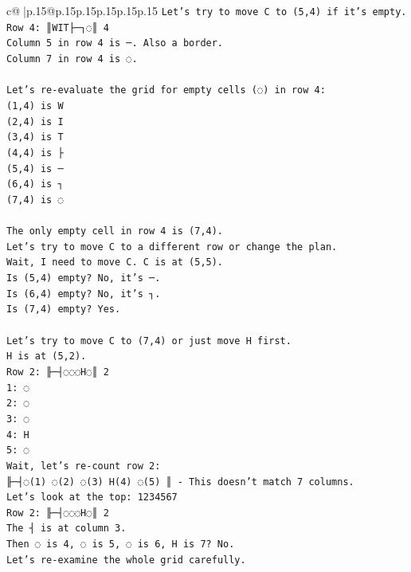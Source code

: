 \documentclass{article}
\begin{document}
{\begin{supertabular}{c@{$\;$}|p{.15\linewidth}@{}p{.15\linewidth}p{.15\linewidth}p{.15\linewidth}p{.15\linewidth}p{.15\linewidth}}
{{{\texttt{Let's try to move C to (5,4) if it's empty.} \\
\texttt{Row 4: ║WIT├─┐◌║ 4} \\
\texttt{Column 5 in row 4 is ─. Also a border.} \\
\texttt{Column 7 in row 4 is ◌.} \\
\\ 
\texttt{Let's re{-}evaluate the grid for empty cells (◌) in row 4:} \\
\texttt{(1,4) is W} \\
\texttt{(2,4) is I} \\
\texttt{(3,4) is T} \\
\texttt{(4,4) is ├} \\
\texttt{(5,4) is ─} \\
\texttt{(6,4) is ┐} \\
\texttt{(7,4) is ◌} \\
\\ 
\texttt{The only empty cell in row 4 is (7,4).} \\
\texttt{Let's try to move C to a different row or change the plan.} \\
\texttt{Wait, I need to move C. C is at (5,5).} \\
\texttt{Is (5,4) empty? No, it's ─.} \\
\texttt{Is (6,4) empty? No, it's ┐.} \\
\texttt{Is (7,4) empty? Yes.} \\
\\ 
\texttt{Let's try to move C to (7,4) or just move H first.} \\
\texttt{H is at (5,2).} \\
\texttt{Row 2: ╟─┤◌◌◌H◌║ 2} \\
\texttt{1: ◌} \\
\texttt{2: ◌} \\
\texttt{3: ◌} \\
\texttt{4: H} \\
\texttt{5: ◌} \\
\texttt{Wait, let's re{-}count row 2:} \\
\texttt{╟─┤◌(1) ◌(2) ◌(3) H(4) ◌(5) ║ {-} This doesn't match 7 columns.} \\
\texttt{Let's look at the top:  1234567} \\
\texttt{Row 2: ╟─┤◌◌◌H◌║ 2} \\
\texttt{The ┤ is at column 3.} \\
\texttt{Then ◌ is 4, ◌ is 5, ◌ is 6, H is 7? No.} \\
\texttt{Let's re{-}examine the whole grid carefully.} \\
}}}
\end{supertabular}}
\end{document}
